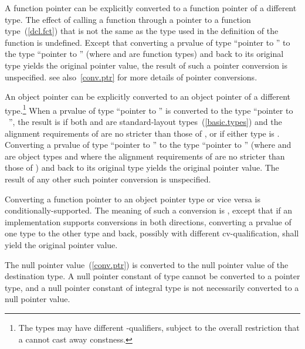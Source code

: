 \pnum
{}%
%
%
A function pointer can be explicitly converted
to a function pointer of a different type.
%
The effect of calling a function through a pointer to a function
type~(\ref{dcl.fct}) that is not the same as the type used in the
definition of the function is undefined. Except that converting
a prvalue of type ``pointer to '' to the type ``pointer to
'' (where  and  are function types) and
back to its original type yields the original pointer value, the result
of such a pointer conversion is unspecified.
\enternote 
see also~\ref{conv.ptr} for more details of pointer conversions.
\exitnote 

\pnum
An object pointer
can be explicitly converted to an object pointer of a different type.\footnote{The
types may have different \cv-qualifiers, subject to
the overall
restriction that a  cannot cast away constness.}
When a prvalue  of type ``pointer to '' is converted to
the type ``pointer to \cv\ '', the result is  if both  and  are standard-layout types~(\ref{basic.types}) and the
alignment requirements of \tcode{T2} are no stricter than those of
, or if either type is \tcode{void}.
Converting a prvalue of type ``pointer to '' to
the type ``pointer to '' (where  and  are
object types and where the alignment requirements of \tcode{T2} are no
stricter than those of \tcode{T1}) and back to its original type yields
the original pointer value. The result of any other such pointer conversion is
unspecified.

\pnum
Converting a function pointer to an object pointer
type or vice versa is
conditionally-supported. The meaning of such a conversion is
,
except that if an implementation
supports conversions in both directions, converting a prvalue of one type to the other
type and back, possibly with different cv-qualification, shall yield the original
pointer value.

\pnum
The null pointer value~(\ref{conv.ptr}) is converted to the null pointer value
of the destination type.
\enternote
A null pointer constant of type  cannot be converted to a
pointer type, and a null pointer constant of integral type is not necessarily
converted to a null pointer value.
\exitnote

